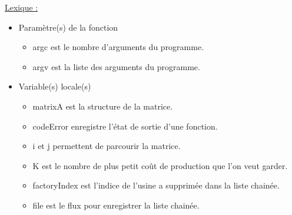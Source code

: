 \documentclass[a4paper]{article}
\begin{document}
\underline{Lexique :}
\begin{itemize}
\item Paramètre(s) de la fonction  
\begin{itemize}
\item argc est le nombre d'arguments du programme.
\item argv est la liste des arguments du programme.
\end{itemize}
\item Variable(s) locale(s)
\begin{itemize}
\item matrixA est la structure de la matrice.
\item codeError enregistre l'état de sortie d'une fonction.
\item i et j permettent de parcourir la matrice.
\item K est le nombre de plus petit coût de production que l'on veut garder.
\item factoryIndex est l'indice de l'usine a supprimée dans la liste chainée.
\item file est le flux pour enregistrer la liste chainée.
\end{itemize}
\end{itemize}
\end{document}
